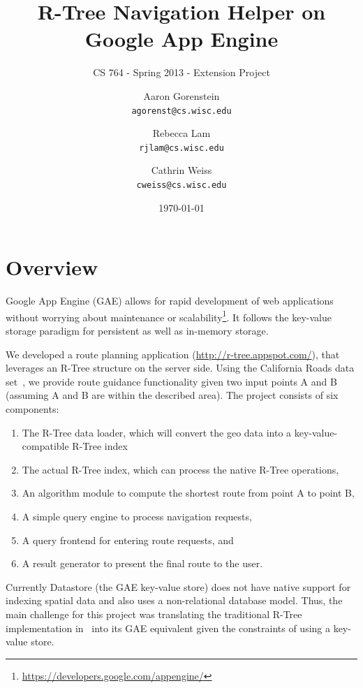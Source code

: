 \documentclass{scrartcl}
\newcommand{\email}[1]{\texttt{#1}}
\begin{document}
\title{R-Tree Navigation Helper on Google App Engine}
\subtitle{CS 764 - Spring 2013 - Extension Project}

\author{
Aaron Gorenstein\\
	\email{agorenst@cs.wisc.edu}
\and
Rebecca Lam\\
	\email{rjlam@cs.wisc.edu}
\and
Cathrin Weiss\\
	\email{cweiss@cs.wisc.edu}       
}

\date{\today}

\maketitle

\section{Overview}
\label{sec:intro}
Google App Engine (GAE) allows for rapid development of web applications without worrying about maintenance or scalability\footnote{\url{https://developers.google.com/appengine/}}. It follows the key-value storage paradigm for persistent as well as in-memory storage. 

We developed a route planning application (\url{http://r-tree.appspot.com/}), that leverages an R-Tree structure on the server side. Using the California Roads data set~\cite{Online:cardata}, we provide route guidance functionality given two input points A and B (assuming A and B are within the described area). The project consists of six components:

\begin{enumerate}
\item The R-Tree data loader, which will convert the geo data into a key-value-compatible R-Tree index
\item The actual R-Tree index, which can process the native R-Tree operations,
\item An algorithm module to compute the shortest route from point A to point B,
\item A simple query engine to process navigation requests, 
\item A query frontend for entering route requests, and
\item A result generator to present the final route to the user. 
\end{enumerate}

Currently Datastore (the GAE key-value store) does not have native support for indexing spatial data and also uses a non-relational database model. Thus, the main challenge for this project was translating the traditional R-Tree implementation in~\cite{DBLP:conf/sigmod/Guttman84} into its GAE equivalent given the constraints of using a key-value store.
\end{document}
